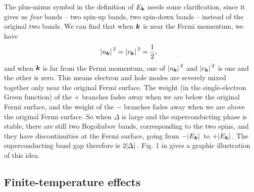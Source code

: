 \documentclass[hyperref, a4paper]{article}
\begin{document}
The plus-minus symbol in the definition of $E_{\vb*{k}}$ 
needs some clarification,
since it gives us \emph{four} bands
-- two spin-up bands, two spin-down bands -- 
instead of the original two bands.
We can find that when $\vb*{k}$ is near the Fermi momentum, 
we have 
\begin{equation}
    \abs*{u_{\vb*{k}}}^2 = \abs*{v_{\vb*{k}}}^2 = \frac{1}{2},
\end{equation}
and when $\vb*{k}$ is far from the Fermi momentum, 
one of $\abs*{u_{\vb*{k}}}^2$ and $\abs*{v_{\vb*{k}}}^2$
is one and the other is zero.
This means electron and hole modes 
are severely mixed together only near the original Fermi surface.
The weight (in the single-electron Green function) of the $+$ branches 
fades away when we are below the original Fermi surface, 
and the weight of the $-$ branches fades away 
when we are above the original Fermi surface.
So when $\Delta$ is large and the superconducting phase is stable, 
there are still two Bogoliubov bands,
corresponding to the two spins, 
and they have discontinuities at the Fermi surface, 
going from $- \abs*{E_{\vb*{k}}}$ to $+ \abs*{E_{\vb*{k}}}$.
The superconducting band gap therefore is $2 \abs*{\Delta}$.
Fig. 1 in \cite{rinott2017tuning} gives a graphic illustration of this idea.

\subsection{Finite-temperature effects}
\end{document}
